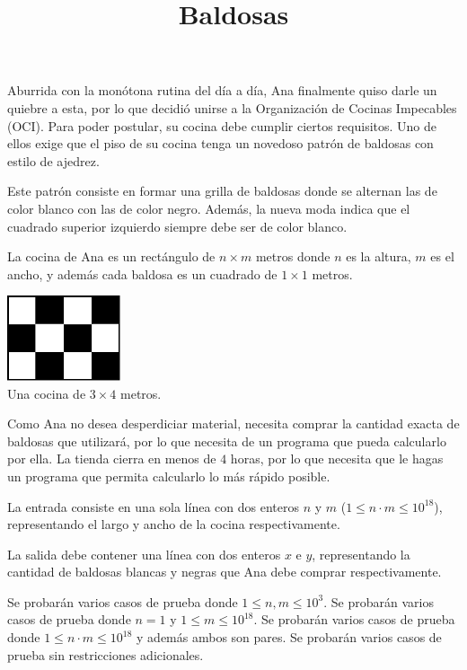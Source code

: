 \documentclass{oci}
\title{Baldosas}
\begin{document}
\begin{problemDescription}
  Aburrida con la monótona rutina del día a día, Ana finalmente quiso darle un quiebre a esta, por lo que decidió unirse
  a la Organización de Cocinas Impecables (OCI). Para poder postular, su cocina debe cumplir ciertos requisitos. Uno de ellos
  exige que el piso de su cocina tenga un novedoso patrón de baldosas con estilo de ajedrez.

  Este patrón consiste en formar una grilla de baldosas donde se alternan las de color blanco con las de color negro. Además,
  la nueva moda indica que el cuadrado superior izquierdo siempre debe ser de color blanco.

  La cocina de Ana es un rectángulo de $n \times m$ metros donde $n$ es la altura, $m$ es el ancho, y además cada baldosa es un cuadrado de $1 \times 1$ metros.

  \begin{center}
    \includegraphics[width=0.25\textwidth]{example-checkerboard.pdf} \\
    Una cocina de $3 \times 4$ metros.
  \end{center}

  Como Ana no desea desperdiciar material, necesita comprar la cantidad exacta de baldosas que utilizará, por lo que necesita
  de un programa que pueda calcularlo por ella. La tienda cierra en menos de $4$ horas, por lo que necesita que le hagas un
  programa que permita calcularlo lo más rápido posible.
\end{problemDescription}

\begin{inputDescription}
  La entrada consiste en una sola línea con dos enteros $n$ y $m$ ($1 \leq n \cdot m \leq 10^{18}$), representando el largo y
  ancho de la cocina respectivamente.
\end{inputDescription}

\begin{outputDescription}
  La salida debe contener una línea con dos enteros $x$ e $y$, representando la cantidad de baldosas blancas y negras que
  Ana debe comprar respectivamente.
\end{outputDescription}

\clearpage
\begin{scoreDescription}
   Se probarán varios casos de prueba donde $1 \leq n, m \leq 10^3$.
   Se probarán varios casos de prueba donde $n = 1$ y $1 \leq m \leq 10^{18}$.
   Se probarán varios casos de prueba donde $1 \leq n \cdot m \leq 10^{18}$ y además ambos son pares.
   Se probarán varios casos de prueba sin restricciones adicionales.
\end{scoreDescription}

\begin{sampleDescription}
\end{sampleDescription}
\end{document}
